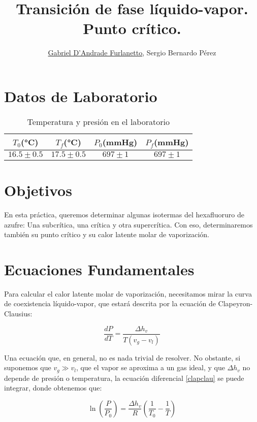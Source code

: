 \documentclass[a4paper,12pt]{article}
\begin{document}
\title{Transición de fase líquido-vapor. Punto crítico.}
\author{\underline{Gabriel D'Andrade Furlanetto}, Sergio Bernardo Pérez} 
\maketitle

\pagebreak 

\pagebreak
\section{Datos de Laboratorio}
\begin{table}[h!]
  \centering
  \caption{Temperatura y presión en el laboratorio}
  \label{bar}
  \begin{tabular}{|c|c|c|c|}
  \hline
    $T_0$(°C) & $T_f$(°C) & $P_0$(mmHg) & $P_f$(mmHg) \\ 
    \hline
    $16.5 \pm 0.5$&$17.5\pm 0.5$ & $697 \pm 1$&$ 697 \pm 1$ \\ 
    \hline 
  \end{tabular}
\end{table}

\section{Objetivos}
En esta práctica, queremos determinar algunas isotermas del hexafluoruro de azufre: Una subcrítica, una crítica y otra supercrítica. Con eso, determinaremos también su punto crítico y su calor latente molar de vaporización. 
\section{Ecuaciones Fundamentales}
Para calcular el calor latente molar de vaporización, necesitamos mirar la curva de coexistencia líquido-vapor, que estará descrita por la ecuación de Clapeyron-Clausius:

\begin{equation}
\label{clapclau}
\frac{dP}{dT} = \frac{\Delta h_v}{T(v_g-v_l)}  
\end{equation}

Una ecuación que, en general, no es nada trivial de resolver. No obstante, si suponemos que $v_{g} \gg v_l $, que el vapor se aproxima a un gas ideal, y que $\Delta h_{v}$ no depende de presión o temperatura, la ecuación diferencial \eqref{clapclau} se puede integrar, donde obtenemos que:

\begin{equation}
  \label{final}
  \ln\left(\frac{P}{P_0}\right) = \frac{\Delta h_v}{R} \left(\frac{1}{T_0}-\frac{1}{T}\right)
\end{equation}
\end{document}
